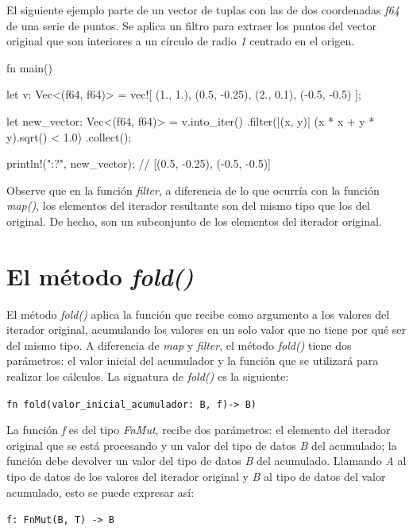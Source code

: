 El siguiente ejemplo parte de un vector de tuplas con las de dos coordenadas \textit{f64} de una serie de puntos. Se aplica un filtro para extraer los puntos del vector original que son interiores a un círculo de radio \textit{1} centrado en el origen.

\vspace{0.7em}
\begin{Codigo}
   fn main() {
      let v: Vec<(f64, f64)> = vec![
      (1., 1.), (0.5, -0.25), 
      (2., 0.1), (-0.5, -0.5)
      ];
      
      let new_vector: Vec<(f64, f64)> = v.into_iter()
         .filter(|(x, y)| (x * x + y * y).sqrt() < 1.0)
         .collect();
      
      println!("{:?}", new_vector); // [(0.5, -0.25), (-0.5, -0.5)]
   }
\end{Codigo}

Observe que en la función \textit{filter}, a diferencia de lo que ocurría con la función \textit{map()}, los elementos del iterador resultante son del mismo tipo que los del original. De hecho, son un subconjunto de los elementos del iterador original.

\section{El método \textit{fold()}}
El método \textit{fold()} aplica la función que recibe como argumento a los valores del iterador original, acumulando los valores en un solo valor que no tiene por qué ser del mismo tipo. A diferencia de \textit{map} y \textit{filter}, el método \textit{fold()} tiene dos parámetros: el valor inicial del acumulador y la función que se utilizará para realizar los cálculos. La signatura de \textit{fold()} es la siguiente:

{\centering \texttt{fn fold(valor\_inicial\_acumulador: B, f)-> B)} \par}

La función \textit{f} es del tipo \textit{FnMut}, recibe dos parámetros: el elemento del iterador original que se está procesando y un valor del tipo de datos \textit{B} del acumulado; la función debe devolver un valor del tipo de datos \textit{B} del acumulado. Llamando \textit{A} al tipo de datos de los valores del iterador original y \textit{B} al tipo de datos del valor acumulado, esto se puede expresar así:

{\centering \texttt{f: FnMut(B, T) -> B} \par}

